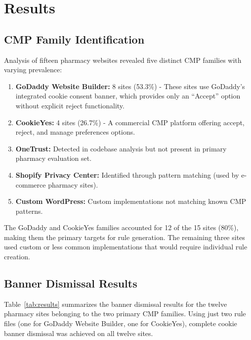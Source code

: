 \documentclass[conference]{IEEEtran}
\begin{document}
\section{Results}

\subsection{CMP Family Identification}

Analysis of fifteen pharmacy websites revealed five distinct CMP families with varying prevalence:

\begin{enumerate}

    \item \textbf{GoDaddy Website Builder:} 8 sites (53.3\%) - These sites use GoDaddy's integrated cookie consent banner, which provides only an ``Accept'' option without explicit reject functionality.

    

    \item \textbf{CookieYes:} 4 sites (26.7\%) - A commercial CMP platform offering accept, reject, and manage preferences options.

    

    \item \textbf{OneTrust:} Detected in codebase analysis but not present in primary pharmacy evaluation set.

    

    \item \textbf{Shopify Privacy Center:} Identified through pattern matching (used by e-commerce pharmacy sites).

    

    \item \textbf{Custom WordPress:} Custom implementations not matching known CMP patterns.

\end{enumerate}

The GoDaddy and CookieYes families accounted for 12 of the 15 sites (80\%), making them the primary targets for rule generation. The remaining three sites used custom or less common implementations that would require individual rule creation.

\subsection{Banner Dismissal Results}

Table~\ref{tab:results} summarizes the banner dismissal results for the twelve pharmacy sites belonging to the two primary CMP families. Using just two rule files (one for GoDaddy Website Builder, one for CookieYes), complete cookie banner dismissal was achieved on all twelve sites.
\end{document}
